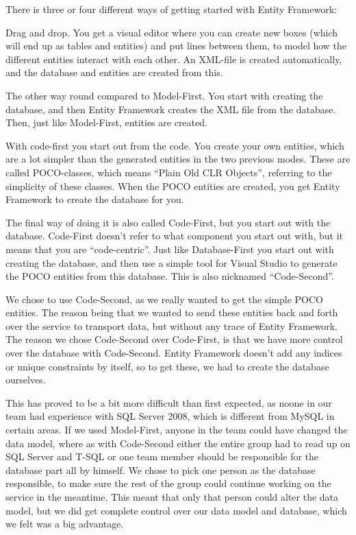There is three or four different ways of getting started with Entity Framework:

\begin{description}\addtolength{\itemsep}{-7pt}
\item[Model-First] Drag and drop. You get a visual editor where you can create new boxes (which will end up as tables and entities) and put lines between them, to model how the different entities interact with each other. An XML-file is created automatically, and the database and entities are created from this.
\item[Database-First] The other way round compared to Model-First. You start with creating the database, and then Entity Framework creates the XML file from the database. Then, just like Model-First, entities are created.
\item[Code-First] With code-first you start out from the code. You create your own entities, which are a lot simpler than the generated entities in the two previous modes. These are called POCO-classes, which means ``Plain Old CLR Objects'', referring to the simplicity of these classes. When the POCO entities are created, you get Entity Framework to create the database for you.
\item[Code-First] The final way of doing it is also called Code-First, but you start out with the database. Code-First doesn't refer to what component you start out with, but it means that you are ``code-centric''. Just like Database-First you start out with creating the database, and then use a simple tool for Visual Studio to generate the POCO entities from this database. This is also nicknamed ``Code-Second''.
\end{description}

We chose to use Code-Second, as we really wanted to get the simple POCO entities. The reason being that we wanted to send these entities back and forth over the service to transport data, but without any trace of Entity Framework. The reason we chose Code-Second over Code-First, is that we have more control over the database with Code-Second. Entity Framework doesn't add any indices or unique constraints by itself, so to get these, we had to create the database ourselves.

This has proved to be a bit more difficult than first expected, as noone in our team had experience with SQL Server 2008, which is different from MySQL in certain areas. If we used Model-First, anyone in the team could have changed the data model, where as with Code-Second either the entire group had to read up on SQL Server and T-SQL or one team member should be responsible for the database part all by himself. We chose to pick one person as the database responsible, to make sure the rest of the group could continue working on the service in the meantime. This meant that only that person could alter the data model, but we did get complete control over our data model and database, which we felt was a big advantage.